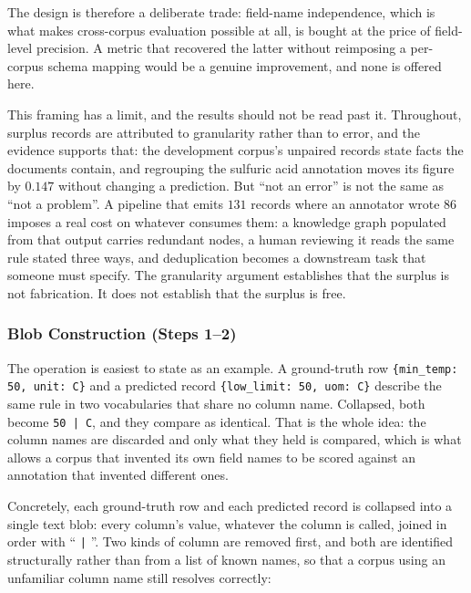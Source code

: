\documentclass[11pt]{article}
\begin{document}
The design is therefore a deliberate trade: field-name independence, which is
what makes cross-corpus evaluation possible at all, is bought at the price of
field-level precision. A metric that recovered the latter without reimposing a
per-corpus schema mapping would be a genuine improvement, and none is offered
here.

This framing has a limit, and the results should not be read past it.
Throughout, surplus records are attributed to granularity rather
than to error, and the evidence supports that: the development corpus's
unpaired records state facts the documents contain, and regrouping the sulfuric
acid annotation moves its figure by $0.147$ without changing a prediction. But
``not an error'' is not the same as ``not a problem''. A pipeline that emits
$131$ records where an annotator wrote $86$ imposes a real cost on whatever
consumes them: a knowledge graph populated from that output carries redundant
nodes, a human reviewing it reads the same rule stated three ways, and
deduplication becomes a downstream task that someone must specify. The
granularity argument establishes that the surplus is not fabrication. It does
not establish that the surplus is free.

\subsubsection{Blob Construction (Steps 1--2)}
\label{sec:blob}
The operation is easiest to state as an example. A ground-truth row
\texttt{\{min\_temp: 50, unit: C\}} and a predicted record
\texttt{\{low\_limit: 50, uom: C\}} describe the same rule in two vocabularies
that share no column name. Collapsed, both become \texttt{50 | C}, and they
compare as identical. That is the whole idea: the column names are discarded and
only what they held is compared, which is what allows a corpus that invented its
own field names to be scored against an annotation that invented different ones.

Concretely, each ground-truth row and each predicted record is collapsed into a
single text blob: every column's value, whatever the column is called, joined in
order with `` \texttt{|} ''. Two kinds of column are removed first, and both are identified
structurally rather than from a list of known names, so that a corpus using an
unfamiliar column name still resolves correctly:
\end{document}
